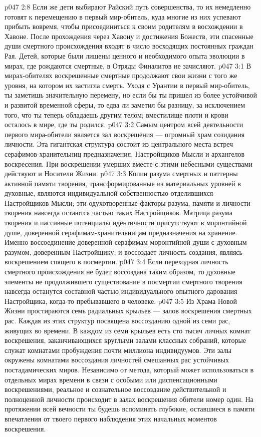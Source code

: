\vs p047 2:8 Если же дети выбирают Райский путь совершенства, то их немедленно готовят к перемещению в первый мир\hyp{}обитель, куда многие из них успевают прибыть вовремя, чтобы присоединиться к своим родителям в восхождении в Хавоне. После прохождения через Хавону и достижения Божеств, эти спасенные души смертного происхождения входят в число восходящих постоянных граждан Рая. Детей, которые были лишены ценного и необходимого опыта эволюции в мирах, где рождаются смертные, в Отряды Финалитов не зачисляют.
\vs p047 3:1 В мирах\hyp{}обителях воскрешенные смертные продолжают свои жизни с того же уровня, на котором их застигла смерть. Уходя с Урантии в первый мир\hyp{}обитель, ты заметишь значительную перемену, но если бы ты пришел из более устойчивой и развитой временной сферы, то едва ли заметил бы разницу, за исключением того, что ты теперь обладаешь другим телом; вместилище плоти и крови осталось в мире, где ты родился.
\vs p047 3:2 Самым центром всей деятельности первого мира\hyp{}обители является зал воскрешения --- огромный храм созидания личности. Эта гигантская структура состоит из центрального места встреч серафимов\hyp{}хранительниц предназначения, Настройщиков Мысли и архангелов воскресения. При воскрешении умерших вместе с этими небесными существами действуют и Носители Жизни.
\vs p047 3:3 Копии разума смертных и паттерны активной памяти творения, трансформированные из материальных уровней в духовные, являются индивидуальной собственностью отделившихся Настройщиков Мысли; эти одухотворенные факторы разума, памяти и личности творения навсегда остаются частью таких Настройщиков. Матрица разума творения и пассивные потенциалы идентичности присутствуют в моронтийной душе, доверенной серафимам\hyp{}хранительницам предназначения на хранение. Именно воссоединение доверенной серафимам моронтийной души с духовным разумом, доверенным Настройщику, и воссоздает личность создания, являясь воскрешением спящего в посмертии.
\vs p047 3:4 Если переходная личность смертного происхождения не будет воссоздана таким образом, то духовные элементы не продолжившего существование в посмертии смертного творения навсегда останутся составной частью индивидуального опытного дарования Настройщика, когда\hyp{}то пребывавшего в человеке.
\vs p047 3:5 Из Храма Новой Жизни простираются семь радиальных крыльев --- залов воскрешения смертных рас. Каждая из этих структур посвящена воссозданию одной из семи рас, живущих во времени. В каждом из семи крыльев есть сто тысяч личных комнат воскрешения, заканчивающихся круглыми залами классных собраний, которые служат комнатами пробуждения почти миллиона индивидуумов. Эти залы окружены комнатами воссоздания личностей смешанных рас устойчивых постадамических миров. Независимо от метода, который может использоваться в отдельных мирах времени в связи с особыми или диспенсационными воскрешениями, реальное и сознательное воссоздание действительной и полноценной личности происходит в залах воскрешения обители номер один. На протяжении всей вечности ты будешь вспоминать глубокие, оставшиеся в памяти впечатления от твоего первого наблюдения этих начальных моментов воскрешения.
